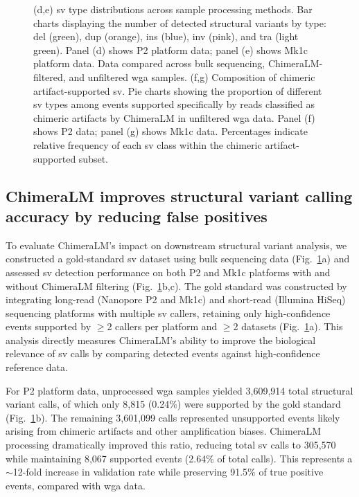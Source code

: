 \documentclass[pdflatex,sn-nature]{sn-jnl}%
\theoremstyle{thmstyleone}%
\theoremstyle{thmstyletwo}%
\theoremstyle{thmstylethree}%
\begin{document}
\begin{figure}[!ht]
{		(d,e) \gls{sv} type distributions across sample processing methods. Bar charts displaying the number of detected structural variants by type: \gls{del} (green), \gls{dup} (orange), \gls{ins} (blue), \gls{inv} (pink), and \gls{tra} (light green). Panel (d) shows P2 platform data; panel (e) shows Mk1c platform data. Data compared across bulk sequencing, ChimeraLM-filtered, and unfiltered \gls{wga} samples.
		(f,g) Composition of chimeric artifact-supported \gls{sv}. Pie charts showing the proportion of different \gls{sv} types among events supported specifically by reads classified as chimeric artifacts by ChimeraLM in unfiltered \gls{wga} data. Panel (f) shows P2 data; panel (g) shows Mk1c data. Percentages indicate relative frequency of each \gls{sv} class within the chimeric artifact-supported subset.}\label{fig:figure3}
\end{figure}

\subsection*{ChimeraLM improves structural variant calling accuracy by reducing false positives}

To evaluate ChimeraLM's impact on downstream structural variant analysis, we constructed a gold-standard \gls{sv} dataset using bulk sequencing data (Fig.~\ref{fig:figure3}a) and assessed \gls{sv} detection performance on both P2 and Mk1c platforms with and without ChimeraLM filtering (Fig.~\ref{fig:figure3}b,c).
The gold standard was constructed by integrating long-read (Nanopore P2 and Mk1c) and short-read (Illumina HiSeq) sequencing platforms with multiple \gls{sv} callers, retaining only high-confidence events supported by $\geq$2 callers per platform and $\geq$2 datasets (Fig.~\ref{fig:figure3}a).
This analysis directly measures ChimeraLM's ability to improve the biological relevance of \gls{sv} calls by comparing detected events against high-confidence reference data.

For P2 platform data, unprocessed \gls{wga} samples yielded 3,609,914 total structural variant calls, of which only 8,815 (0.24\%) were supported by the gold standard (Fig.~\ref{fig:figure3}b).
The remaining 3,601,099 calls represented unsupported events likely arising from chimeric artifacts and other amplification biases.
ChimeraLM processing dramatically improved this ratio, reducing total \gls{sv} calls to 305,570 while maintaining 8,067 supported events (2.64\% of total calls).
This represents a $\sim$12-fold increase in validation rate while preserving 91.5\% of true positive events, compared with \gls{wga} data.
\end{document}

